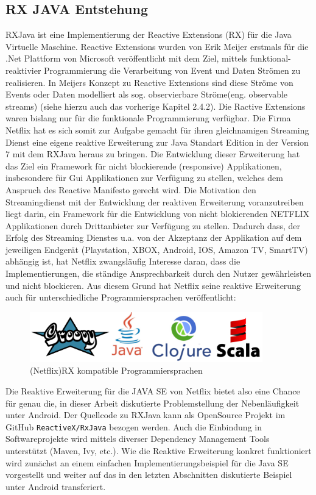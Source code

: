 \documentclass[12pt,oneside,a4paper,bibtotoc,liststotoc]{scrreprt}
\begin{document}
\subsection{RX JAVA Entstehung}
RXJava ist eine Implementierung der Reactive Extensions (RX) für die Java Virtuelle Maschine. Reactive Extensions wurden von Erik Meijer erstmals für die .Net Plattform von Microsoft veröffentlicht mit dem Ziel, mittels funktional-reaktivier Programmierung die Verarbeitung von Event und Daten Strömen zu realisieren. In Meijers Konzept zu Reactive Extensions sind diese Ströme von Events oder Daten modelliert als sog. \glqq observierbare Ströme\grqq (eng. observable streams) (siehe hierzu auch das vorherige Kapitel 2.4.2). Die Ractive Extensions waren bislang nur für die funktionale Programmierung verfügbar. Die Firma Netflix hat es sich somit zur Aufgabe gemacht für ihren gleichnamigen Streaming Dienst eine eigene reaktive Erweiterung zur Java Standart Edition in der Version 7 mit dem RXJava heraus zu bringen. Die Entwicklung dieser Erweiterung hat das Ziel ein Framework für nicht blockierende (responsive) Applikationen, insbesondere für Gui Applikationen zur Verfügung zu stellen, welches dem Anspruch des Reactive Manifesto gerecht wird. Die Motivation den Streamingdienst mit der Entwicklung der reaktiven Erweiterung voranzutreiben liegt darin, ein Framework für die Entwicklung von nicht blokierenden NETFLIX Applikationen durch Drittanbieter zur Verfügung zu stellen. Dadurch dass, der Erfolg des Streaming Dienstes u.a. von der Akzeptanz der Applikation auf dem jeweiligen Endgerät (Playstation, XBOX, Android, IOS, Amazon TV, SmartTV) abhängig ist, hat Netflix zwangsläufig Interesse daran, dass die Implementierungen, die ständige Ansprechbarkeit durch den Nutzer gewährleisten und nicht blockieren. Aus diesem Grund hat Netflix seine reaktive Erweiterung auch für unterschiedliche Programmiersprachen veröffentlicht:
\begin{figure}[H]
  \begin{centering}
    \includegraphics[width=0.9\textwidth]{img/rx-languages.png}
    \caption{(Netflix)RX kompatible Programmiersprachen}
    \label{rx-languages}
  \end{centering}
\end{figure} 
Die Reaktive Erweiterung für die JAVA SE von Netflix bietet also eine Chance für genau die, in dieser Arbeit diskutierte Problemstellung der Nebenläufigkeit unter Android. Der Quellcode zu RXJava kann als OpenSource Projekt im GitHub \texttt{ReactiveX/RxJava} bezogen werden. Auch die Einbindung in Softwareprojekte wird mittels diverser Dependency Management Tools unterstützt (Maven, Ivy, etc.). Wie die Reaktive Erweiterung konkret funktioniert wird zunächst an einem einfachen Implementierungsbeispiel für die Java SE vorgestellt und weiter auf das in den letzten Abschnitten diskutierte Beispiel unter Android transferiert.
\end{document}
